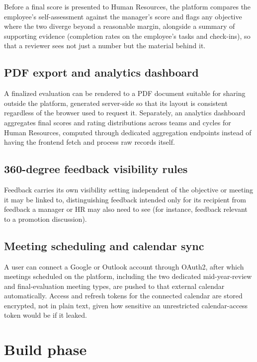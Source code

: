 \documentclass[12pt,a4paper]{report}
\begin{document}
Before a final score is presented to Human Resources, the platform compares the employee's self-assessment against the manager's score and flags any objective where the two diverge beyond a reasonable margin, alongside a summary of supporting evidence (completion rates on the employee's tasks and check-ins), so that a reviewer sees not just a number but the material behind it.

\subsection{PDF export and analytics dashboard}

A finalized evaluation can be rendered to a PDF document suitable for sharing outside the platform, generated server-side so that its layout is consistent regardless of the browser used to request it. Separately, an analytics dashboard aggregates final scores and rating distributions across teams and cycles for Human Resources, computed through dedicated aggregation endpoints instead of having the frontend fetch and process raw records itself.

\subsection{360-degree feedback visibility rules}

Feedback carries its own visibility setting independent of the objective or meeting it may be linked to, distinguishing feedback intended only for its recipient from feedback a manager or HR may also need to see (for instance, feedback relevant to a promotion discussion).

\subsection{Meeting scheduling and calendar sync}

A user can connect a Google or Outlook account through OAuth2, after which meetings scheduled on the platform, including the two dedicated mid-year-review and final-evaluation meeting types, are pushed to that external calendar automatically. Access and refresh tokens for the connected calendar are stored encrypted, not in plain text, given how sensitive an unrestricted calendar-access token would be if it leaked.

\section{Build phase}
\end{document}
